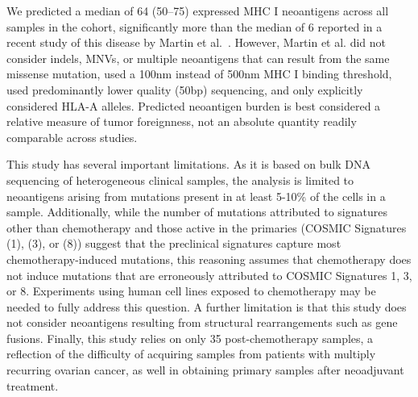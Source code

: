We predicted a median of 64 (50--75) expressed MHC I neoantigens across all samples in the cohort, significantly more than the median of 6 reported in a recent study of this disease by Martin et al.~\cite{Martin_2016}. However, Martin et al. did not consider indels, MNVs, or multiple neoantigens that can result from the same missense mutation, used a 100nm instead of 500nm MHC I binding threshold, used predominantly lower quality (50bp) sequencing, and only explicitly considered HLA-A alleles. Predicted neoantigen burden is best considered a relative measure of tumor foreignness, not an absolute quantity readily comparable across studies.

This study has several important limitations. As it is based on bulk DNA sequencing of heterogeneous clinical samples, the analysis is limited to neoantigens arising from mutations present in at least 5-10\% of the cells in a sample. Additionally, while the number of mutations attributed to signatures other than chemotherapy and those active in the primaries (COSMIC Signatures (1), (3), or (8)) suggest that the preclinical signatures capture most chemotherapy-induced mutations, this reasoning assumes that chemotherapy does not induce mutations that are erroneously attributed to COSMIC Signatures 1, 3, or 8. Experiments using human cell lines exposed to chemotherapy may be needed to fully address this question. A further limitation is that this study does not consider neoantigens resulting from structural rearrangements such as gene fusions. Finally, this study relies on only 35 post-chemotherapy samples, a reflection of the difficulty of acquiring samples from patients with multiply recurring ovarian cancer, as well in obtaining primary samples after neoadjuvant treatment.
